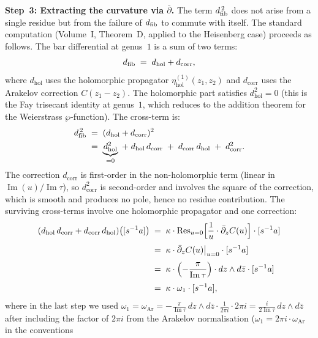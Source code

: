 \begin{computation}
\smallskip\noindent
\textbf{Step~3: Extracting the curvature via $\bar\partial$.}
The term $d_{\mathrm{fib}}^{\,2}$ does not arise from a
single residue but from the failure of $d_{\mathrm{fib}}$ to commute with
itself. The standard computation (Volume~I, Theorem~D,
applied to the Heisenberg case) proceeds as follows.
The bar differential at genus~$1$ is a sum of two terms:
\[
 d_{\mathrm{fib}}
 \;=\;
 d_{\mathrm{hol}} + d_{\mathrm{corr}},
\]
where $d_{\mathrm{hol}}$ uses the holomorphic propagator
$\eta^{(1)}_{\mathrm{hol}}(z_1,z_2)$ and $d_{\mathrm{corr}}$ uses
the Arakelov correction $C(z_1-z_2)$. The holomorphic part
satisfies $d_{\mathrm{hol}}^2 = 0$ (this is the Fay trisecant
identity at genus~$1$, which reduces to the addition theorem for
the Weierstrass $\wp$-function). The cross-term is:
\begin{align}\label{eq:cross-term}
 d_{\mathrm{fib}}^{\,2}
 &\;=\;
 (d_{\mathrm{hol}} + d_{\mathrm{corr}})^2
 \notag\\
 &\;=\;
 \underbrace{d_{\mathrm{hol}}^2}_{= 0}
 \;+\;
 d_{\mathrm{hol}}\, d_{\mathrm{corr}}
 \;+\;
 d_{\mathrm{corr}}\, d_{\mathrm{hol}}
 \;+\;
 d_{\mathrm{corr}}^2.
\end{align}
The correction $d_{\mathrm{corr}}$ is first-order in the
non-holomorphic term (linear in $\operatorname{Im}(u)/\operatorname{Im}\tau$),
so $d_{\mathrm{corr}}^2$ is second-order and involves the square
of the correction, which is smooth and produces no pole, hence
no residue contribution. The surviving cross-terms involve
one holomorphic propagator and one correction:
\begin{align}\label{eq:cross-contribution}
 (d_{\mathrm{hol}}\, d_{\mathrm{corr}} +
 d_{\mathrm{corr}}\, d_{\mathrm{hol}})
 \bigl([s^{-1}a]\bigr)
 &\;=\;
 \kappa \cdot
 \operatorname{Res}_{u=0}\Bigl[
 \frac{1}{u} \cdot \bar\partial_z C(u)
 \Bigr]
 \cdot [s^{-1}a]
 \notag\\[3pt]
 &\;=\;
 \kappa \cdot \bar\partial_z C(u)\big|_{u=0}
 \cdot [s^{-1}a]
 \notag\\[3pt]
 &\;=\;
 \kappa \cdot
 \Bigl(-\frac{\pi}{\operatorname{Im}\tau}\Bigr)
 \cdot dz \wedge d\bar z
 \cdot [s^{-1}a]
 \notag\\[3pt]
 &\;=\;
 \kappa \cdot \omega_1 \cdot [s^{-1}a],
\end{align}
where in the last step we used
$\omega_1 = \omega_{\mathrm{Ar}} = -\frac{\pi}{\operatorname{Im}\tau}\,
dz \wedge d\bar z \cdot \frac{1}{2\pi i} \cdot 2\pi i =
\frac{i}{2\operatorname{Im}\tau}\, dz \wedge d\bar z$ after
including the factor of $2\pi i$ from the Arakelov normalisation
($\omega_1 = 2\pi i \cdot \omega_{\mathrm{Ar}}$ in the conventions

\end{computation}
